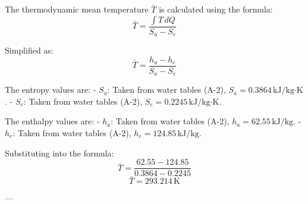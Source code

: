 The thermodynamic mean temperature \( \bar{T} \) is calculated using the formula:  
\[
\bar{T} = \frac{\int T \, dQ}{S_a - S_e}
\]  

Simplified as:  
\[
\bar{T} = \frac{h_a - h_e}{S_a - S_e}
\]  

The entropy values are:  
- \( S_a \): Taken from water tables (A-2), \( S_a = 0.3864 \, \text{kJ/kg·K} \).  
- \( S_e \): Taken from water tables (A-2), \( S_e = 0.2245 \, \text{kJ/kg·K} \).  

The enthalpy values are:  
- \( h_a \): Taken from water tables (A-2), \( h_a = 62.55 \, \text{kJ/kg} \).  
- \( h_e \): Taken from water tables (A-2), \( h_e = 124.85 \, \text{kJ/kg} \).  

Substituting into the formula:  
\[
\bar{T} = \frac{62.55 - 124.85}{0.3864 - 0.2245}
\]  
\[
\bar{T} = 293.214 \, \text{K}
\]  

---